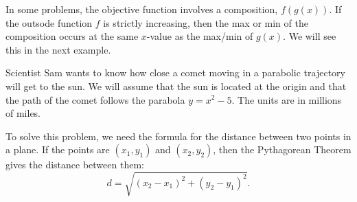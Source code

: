 \documentclass{ximera}
\begin{document}
In some problems, the objective function involves a composition, $f(g(x))$.  
If the outsode function $f$ is strictly increasing, then the max or min of the composition occurs at the same $x$-value as the max/min of $g(x)$. 
We will see this in the next example.
\begin{example}[example 3]
Scientist Sam wants to know how close a comet moving in a parabolic trajectory will get to the sun. 
We will assume that the sun is located at the origin and that the path of the comet follows the parabola $y = x^2 - 5$. The units 
are in millions of miles.

\begin{center}
\end{center}
To solve this problem, we need the formula for the distance between two points in a plane.
If the points are $(x_1, y_1)$ and $(x_2, y_2)$, then the Pythagorean Theorem gives the distance between them:
\[
d = \sqrt{(x_2 - x_1)^2 + (y_2 - y_1)^2}.
\]
\begin{image}
\end{image}



\end{example}
\end{document}
